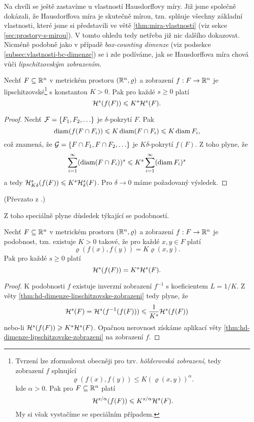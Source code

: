 Na chvíli se ještě zastavíme u vlastností Hausdorffovy míry. Již jsme společně dokázali, že Hausdorffova míra je skutečně mírou, tzn. splňuje všechny základní vlastnosti, které jsme si představili ve větě \ref{thm:mira-vlastnosti} (viz sekce \ref{sec:prostory-s-mirou}). V tomto ohledu tedy netřeba již nic dalšího dokazovat. Nicméně podobně jako v případě \emph{box-counting dimenze} (viz podsekce \ref{subsec:vlastnosti-bc-dimenze}) se i zde podíváme, jak se Hausdorffova míra chová vůči \emph{lipschitzovským zobrazením}.
\begin{theorem}\label{thm:hd-dimenze-lipschitzovske-zobrazeni}
    Nechť $F\subseteq\R^n$ v metrickém prostoru $(\R^n,\varrho)$ a zobrazení $\mapping{f}{F}{\R^n}$ je lipschitzovské\footnote{Tvrzení lze zformulovat obecněji pro tzv. \emph{hölderovská zobrazení}, tedy zobrazení $f$ splnující
    \[\varrho(f(x),f(y))\leqslant K(\varrho(x,y))^\alpha.\]
    kde $\alpha>0$. Pak pro $F\subseteq\R^n$ platí
    \[\hausdorffmeasure{s/\alpha}(f(F))\leqslant K^{s/\alpha}\hausdorffmeasure{s}(F).\]
    My si však vystačíme se speciálním případem.} s konstantou $K>0$. Pak pro každé $s\geqslant 0$ platí
    \[\hausdorffmeasure{s}(f(F))\leqslant K^s\hausdorffmeasure{s}(F).\]
\end{theorem}
\begin{proof}
    Nechť $\mathcal{F}=\set{F_1,F_2,\ldots}$ je $\delta$-pokrytí $F$. Pak
    \[\diam(f(F\cap F_i))\leqslant K\diam(F\cap F_i)\leqslant K\diam{F_i},\]
    což znamená, že $\mathcal{G}=\set{F\cap F_1,F\cap F_2,\ldots}$ je $K\delta$-pokrytí $f(F)$. Z toho plyne, že
    \[\sum_{i=1}^{\infty}(\diam(F\cap F_i))^s\leqslant K^s\sum_{i=1}^{\infty}(\diam{F_i})^s\]
    a tedy $\hausdorffdeltameasure{s}{K\delta}(f(F))\leqslant K^s\hausdorffdeltameasure{s}{\delta}(F)$. Pro $\delta\to 0$ máme požadovaný výsledek.
\end{proof}
(Převzato z \citep[str. 46]{Falconer2014}.)

Z toho speciálně plyne důsledek týkající se podobností.
\begin{corollary}\label{cor:hd-dimenze-podobnost}
    Nechť $F\subseteq\R^n$ v metrickém prostoru $(\R^n,\varrho)$ a zobrazení $\mapping{f}{F}{\R^n}$ je podobnost, tzn. existuje $K>0$ takové, že pro každé $x,y\in F$ platí
    \[\varrho(f(x),f(y))=K\varrho(x,y).\]
    Pak pro každé $s\geqslant 0$ platí
    \[\hausdorffmeasure{s}(f(F))=K^s\hausdorffmeasure{s}(F).\]
\end{corollary}
\begin{proof}
    K podobnosti $f$ existuje inverzní zobrazení $f^{-1}$ s koeficientem $L=1/K$. Z věty \ref{thm:hd-dimenze-lipschitzovske-zobrazeni} tedy plyne, že
    \[\hausdorffmeasure{s}(F)=\hausdorffmeasure{s}(f^{-1}(f(F)))\leqslant\dfrac{1}{K^s}\hausdorffmeasure{s}(f(F))\]
    nebo-li $\hausdorffmeasure{s}(f(F))\geqslant K^s\hausdorffmeasure{s}(F)$. Opačnou nerovnost získáme aplikací věty \ref{thm:hd-dimenze-lipschitzovske-zobrazeni} na zobrazení $f$.
\end{proof}

